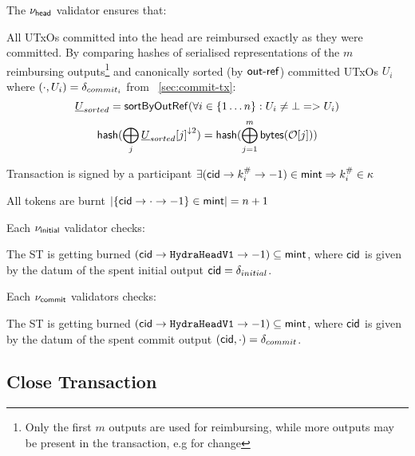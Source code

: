\noindent The $\nu_\mathsf{head}$ validator ensures that:
\begin{menumerate}
  \item All UTxOs committed into the head are reimbursed exactly as they were
  committed. By comparing hashes of serialised representations of the $m$
  reimbursing outputs\footnote{Only the first $m$ outputs are used for
    reimbursing, while more outputs may be present in the transaction, e.g for
    change} and canonically sorted (by $\mathsf{out\textsf{-}{}ref}$) committed UTxOs $U_{i}$ where $(\cdot, U_{i}) = \delta_{commit_{i}}$ from \mtxCom{}~\ref{sec:commit-tx}:
  \[
    \underline{U}_{sorted} = \mathsf{sortByOutRef} ( \forall i \in \{1\dots n\} : U_{i} \neq \bot => U_{i})
  \]
  \[
    \mathsf{hash}(\bigoplus_{j}{\underline{U}_{sorted}[j]}^{\downarrow 2}) = \mathsf{hash}(\bigoplus_{j=1}^{m} \mathsf{bytes}(\mathcal{O}[j]))
  \]

  \item Transaction is signed by a participant $\exists (\mathsf{cid} \rightarrow k^{\#}_{i} \rightarrow -1) \in \mathsf{mint} \Rightarrow k^{\#}_{i} \in \kappa$
  \item All tokens are burnt
  $|\{\mathsf{cid} \rightarrow \cdot \rightarrow -1\} \in \mathsf{mint}| = n + 1$
\end{menumerate} 

\noindent Each $\nu_\mathsf{initial}$ validator checks:
\begin{menumerate}
  \item The ST is getting burned
  $(\mathsf{cid} \rightarrow \texttt{HydraHeadV1} \rightarrow -1) \subseteq \mathsf{mint}$,
  where $\mathsf{cid}$ is given by the datum of the spent initial output
  $\mathsf{cid} = \delta_{initial}$.
\end{menumerate}

\noindent Each $\nu_\mathsf{commit}$ validators checks:
\begin{menumerate}
  \item The ST is getting burned
  $(\mathsf{cid} \rightarrow \texttt{HydraHeadV1} \rightarrow -1) \subseteq \mathsf{mint}$,
  where $\mathsf{cid}$ is given by the datum of the spent commit output $(\mathsf{cid},\cdot) = \delta_{commit}$.
\end{menumerate}

\subsection{Close Transaction}\label{sec:close-tx}

